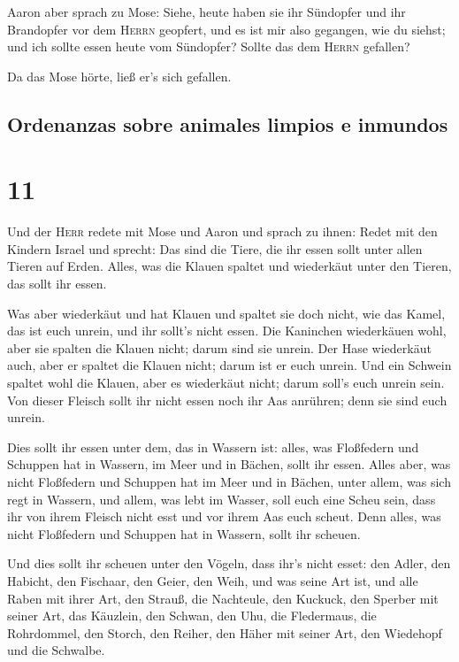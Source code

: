  Aaron aber sprach zu Mose: Siehe, heute haben sie ihr
Sündopfer und ihr Brandopfer vor dem \textsc{Herrn} geopfert, und es ist
mir also gegangen, wie du siehst; und ich sollte essen heute vom
Sündopfer? Sollte das dem \textsc{Herrn} gefallen?

 Da das Mose hörte, ließ er's sich gefallen.

\hypertarget{ordenanzas-sobre-animales-limpios-e-inmundos}{%
\subsection{Ordenanzas sobre animales limpios e
inmundos}\label{ordenanzas-sobre-animales-limpios-e-inmundos}}

\hypertarget{section-10}{%
\section{11}\label{section-10}}

 Und der \textsc{Herr} redete mit Mose und Aaron und
sprach zu ihnen:  Redet mit den Kindern Israel und
sprecht: Das sind die Tiere, die ihr essen sollt unter allen Tieren auf
Erden.  Alles, was die Klauen spaltet und wiederkäut unter
den Tieren, das sollt ihr essen.

 Was aber wiederkäut und hat Klauen und spaltet sie doch
nicht, wie das Kamel, das ist euch unrein, und ihr sollt's nicht essen.
 Die Kaninchen wiederkäuen wohl, aber sie spalten die
Klauen nicht; darum sind sie unrein.  Der Hase wiederkäut
auch, aber er spaltet die Klauen nicht; darum ist er euch unrein.
 Und ein Schwein spaltet wohl die Klauen, aber es
wiederkäut nicht; darum soll's euch unrein sein.  Von
dieser Fleisch sollt ihr nicht essen noch ihr Aas anrühren; denn sie
sind euch unrein.

 Dies sollt ihr essen unter dem, das in Wassern ist:
alles, was Floßfedern und Schuppen hat in Wassern, im Meer und in
Bächen, sollt ihr essen.  Alles aber, was nicht
Floßfedern und Schuppen hat im Meer und in Bächen, unter allem, was sich
regt in Wassern, und allem, was lebt im Wasser, soll euch eine Scheu
sein,  dass ihr von ihrem Fleisch nicht esst und vor
ihrem Aas euch scheut.  Denn alles, was nicht Floßfedern
und Schuppen hat in Wassern, sollt ihr scheuen.

 Und dies sollt ihr scheuen unter den Vögeln, dass ihr's
nicht esset: den Adler, den Habicht, den Fischaar,  den
Geier, den Weih, und was seine Art ist,  und alle Raben
mit ihrer Art,  den Strauß, die Nachteule, den Kuckuck,
den Sperber mit seiner Art,  das Käuzlein, den Schwan,
den Uhu,  die Fledermaus, die Rohrdommel, 
den Storch, den Reiher, den Häher mit seiner Art, den Wiedehopf und die
Schwalbe.

